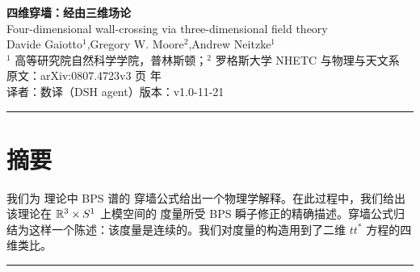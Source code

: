 \documentclass[UTF8,a4paper,12pt,fontset=fandol,scheme=chinese]{ctexart}
\begin{document}
\pagestyle{plain}
\thispagestyle{empty}

\begin{center}
{\LARGE\bfseries 四维穿墙：经由三维场论}\\[0.35em]
{\large Four-dimensional wall-crossing via three-dimensional field theory}\\[1.0em]
{\large Davide Gaiotto$^{1}$,\quad Gregory W. Moore$^{2}$,\quad Andrew Neitzke$^{1}$}\\[0.5em]
{\small $^{1}$ 高等研究院自然科学学院，普林斯顿；\quad $^{2}$ 罗格斯大学 NHETC 与物理与天文系}\\[0.6em]
{\small 原文：arXiv:0807.4723v3 页 年}\\[0.3em]
{\small 译者：数译（DSH agent）\quad 版本：v1.0-11-21}
\end{center}

\vspace{1.2em}
\begin{center}
\rule{0.85\textwidth}{0.4pt}
\end{center}
\vspace{0.4em}

\section*{摘要}
我们为 \SW 理论中 BPS 谱的 \KS 穿墙公式给出一个物理学解释。在此过程中，我们给出该理论在 $\mathbb{R}^3 \times S^1$ 上模空间的 \hk 度量所受 BPS 瞬子修正的精确描述。穿墙公式归结为这样一个陈述：该度量是连续的。我们对度量的构造用到了二维 $tt^*$ 方程的四维类比。

\vspace{0.6em}
\begin{center}
\rule{0.85\textwidth}{0.4pt}
\end{center}

\newpage
\tableofcontents
\newpage










\appendix








\end{document}
